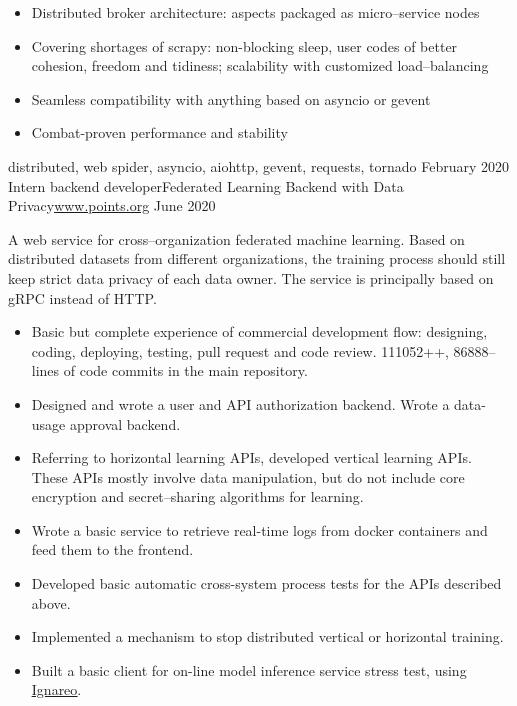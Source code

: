 \begin{experiences}
{\begin{itemize}
                        \item Distributed broker architecture: aspects packaged as micro--service nodes
                        \item Covering shortages of scrapy: non-blocking sleep, user codes of better cohesion, freedom and tidiness; scalability with customized load--balancing
                        \item Seamless compatibility with anything based on asyncio or gevent
                        \item Combat-proven performance and stability
                      \end{itemize}
                    }
                    {distributed, web spider, asyncio, aiohttp, gevent, requests, tornado}
  \emptySeparator
   \experience
    {February 2020} {Intern backend developer}{Federated Learning Backend with Data Privacy}{\href{https://www.points.org}{\underline{www.points.org}}}
    {June 2020}    {
    A web service for cross--organization federated machine learning. Based on distributed datasets from different organizations, the training process should still keep strict data privacy of each data owner. The service is principally based on gRPC instead of HTTP.
                      \begin{itemize}
                        \item Basic but complete experience of commercial development flow: designing, coding, deploying, testing, pull request and code review. 111052++, 86888-- lines of code commits in the main repository.
                        \item Designed and wrote a user and API authorization backend. Wrote a data-usage approval backend.
                        \item Referring to horizontal learning APIs, developed vertical learning APIs. These APIs mostly involve data manipulation, but do not include core encryption and secret--sharing algorithms for learning. 
                        \item Wrote a basic service to retrieve real-time logs from docker containers and feed them to the frontend.
                        \item Developed basic automatic cross-system process tests for the APIs described above.
                        \item Implemented a mechanism to stop distributed vertical or horizontal training.
                        \item Built a basic client for on-line model inference service stress test, using \href{https://github.com/Hecate2/Ignareo-ISML-auto-voter}{\underline{Ignareo}}.

\end{itemize}}
\end{experiences}
